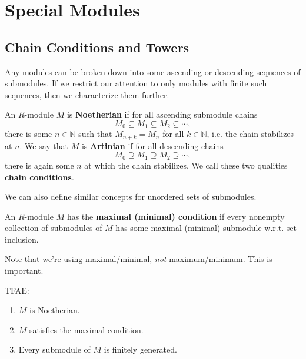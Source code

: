 \documentclass[twoside,10pt]{report}
\begin{document}

\chapter{Special Modules}

\section{Chain Conditions and Towers}

Any modules can be broken down into some ascending or descending sequences of submodules. If we restrict our attention to only modules with finite such sequences, then we characterize them further.

\begin{defn}[]
An $R$-module $M$ is \textbf{Noetherian} if for all ascending submodule chains
\[
M_0 \subseteq M_1 \subseteq M_2 \subseteq \cdots,
\] there is some $n \in \mathbb{N}$ such that $M_{n+k} = M_{n}$ for all $k \in \mathbb{N}$, i.e. the chain stabilizes at $n$. We say that $M$ is \textbf{Artinian} if for all descending chains
\[
M_0 \supseteq M_1 \supseteq M_2 \supseteq \cdots,
\] there is again some $n$ at which the chain stabilizes. We call these two qualities \textbf{chain conditions}.
\end{defn}

We can also define similar concepts for unordered sets of submodules.
\begin{defn}[]
	An $R$-module $M$ has the \textbf{maximal (minimal) condition} if every nonempty collection of submodules of $M$ has some maximal (minimal) submodule w.r.t. set inclusion.
\end{defn}

Note that we're using maximal/minimal, \textit{not} maximum/minimum. This is important.

\begin{thrm}[]
	TFAE:
	\begin{enumerate}
		\item $M$ is Noetherian.
		\item $M$ satisfies the maximal condition.
		\item Every submodule of $M$ is finitely generated.
	\end{enumerate}
\end{thrm}
\end{document}
